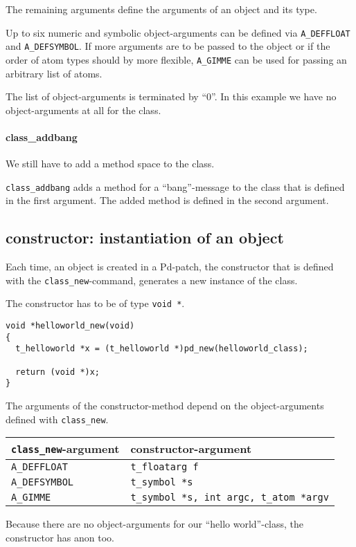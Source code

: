 \documentclass[12pt, a4paper,english,titlepage]{article}
\begin{document}
The remaining arguments define the arguments of an object and its type.

Up to six numeric and symbolic object-arguments can be defined via
\verb+A_DEFFLOAT+ and \verb+A_DEFSYMBOL+.
If more arguments are to be passed to the object
or if the order of atom types should by more flexible, 
\verb+A_GIMME+ can be used for passing an arbitrary list of atoms.

The list of object-arguments is terminated by ``0''.
In this example we have no object-arguments at all for the class.

\paragraph{class\_addbang}
We still have to add a method space to the class.

\verb+class_addbang+ adds a method for a ``bang''-message to the class that is
defined in the first argument.
The added method is defined in the second argument.


\subsection{constructor: instantiation of an object}
Each time, an object is created in a Pd-patch, the
constructor that is defined with the \verb+class_new+-command,
generates a new instance of the class.

The constructor has to be of type \verb+void *+.

\begin{verbatim}
void *helloworld_new(void)
{
  t_helloworld *x = (t_helloworld *)pd_new(helloworld_class);

  return (void *)x;
}
\end{verbatim}


The arguments of the constructor-method depend on the object-arguments
defined with \verb+class_new+.

\begin{tabular}{l|l}
\verb+class_new+-argument&constructor-argument\\
\hline
\verb+A_DEFFLOAT+&\verb+t_floatarg f+ \\
\verb+A_DEFSYMBOL+&\verb+t_symbol *s+ \\
\verb+A_GIMME+&\verb+t_symbol *s, int argc, t_atom *argv+
\end{tabular}

Because there are no object-arguments for our ``hello world''-class,
the constructor has anon too.
\end{document}
